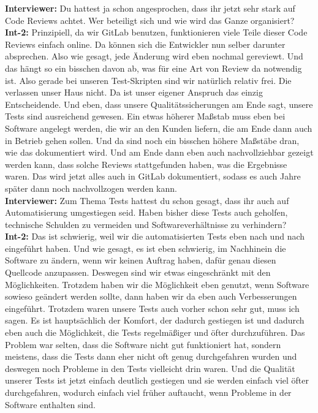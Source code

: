 \textbf{Interviewer:} Du hattest ja schon angesprochen, dass ihr jetzt sehr stark auf Code Reviews achtet. Wer beteiligt sich und wie wird das Ganze organisiert?\\
\textbf{Int-2:} Prinzipiell, da wir GitLab benutzen, funktionieren viele Teile dieser Code Reviews einfach online. Da können sich die Entwickler nun selber darunter absprechen. Also wie gesagt, jede Änderung wird eben nochmal gereviewt. Und das hängt so ein bisschen davon ab, was für eine Art von Review da notwendig ist. Also gerade bei unseren Test-Skripten sind wir natürlich relativ frei. Die verlassen unser Haus nicht. Da ist unser eigener Anspruch das einzig Entscheidende. Und eben, dass unsere Qualitätssicherungen am Ende sagt, unsere Tests sind ausreichend gewesen. Ein etwas höherer Maßstab muss eben bei Software angelegt werden, die wir an den Kunden liefern, die am Ende dann auch in Betrieb gehen sollen. Und da sind noch ein bisschen höhere Maßstäbe dran, wie das dokumentiert wird. Und am Ende dann eben auch nachvollziehbar gezeigt werden kann, dass solche Reviews stattgefunden haben, was die Ergebnisse waren. Das wird jetzt alles auch in GitLab dokumentiert, sodass es auch Jahre später dann noch nachvollzogen werden kann.\\
\textbf{Interviewer:} Zum Thema Tests hattest du schon gesagt, dass ihr auch auf Automatisierung umgestiegen seid. Haben bisher diese Tests auch geholfen, technische Schulden zu vermeiden und Softwareverhältnisse zu verhindern? \\
\textbf{Int-2:} Das ist schwierig, weil wir die automatisierten Tests eben nach und nach eingeführt haben. Und wie gesagt, es ist eben schwierig, im Nachhinein die Software zu ändern, wenn wir keinen Auftrag haben, dafür genau diesen Quellcode anzupassen. Deswegen sind wir etwas eingeschränkt mit den Möglichkeiten. Trotzdem haben wir die Möglichkeit eben genutzt, wenn Software sowieso geändert werden sollte, dann haben wir da eben auch Verbesserungen eingeführt. Trotzdem waren unsere Tests auch vorher schon sehr gut, muss ich sagen. Es ist hauptsächlich der Komfort, der dadurch gestiegen ist und dadurch eben auch die Möglichkeit, die Tests regelmäßiger und öfter durchzuführen. Das Problem war selten, dass die Software nicht gut funktioniert hat, sondern meistens, dass die Tests dann eher nicht oft genug durchgefahren wurden und deswegen noch Probleme in den Tests vielleicht drin waren. Und die Qualität unserer Tests ist jetzt einfach deutlich gestiegen und sie werden einfach viel öfter durchgefahren, wodurch einfach viel früher auftaucht, wenn Probleme in der Software enthalten sind. \\
